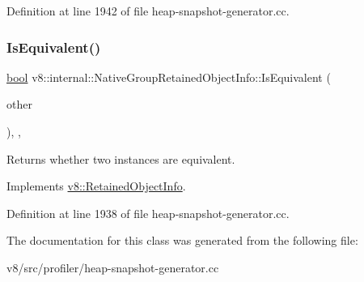Definition at line 1942 of file heap-\/snapshot-\/generator.\+cc.

\mbox{\label{classv8_1_1internal_1_1NativeGroupRetainedObjectInfo_a8d54367b99192c9081d03ccdc8e97612}} 
\subsubsection{\texorpdfstring{Is\+Equivalent()}{IsEquivalent()}}
{\footnotesize\ttfamily \mbox{\hyperlink{classbool}{bool}} v8\+::internal\+::\+Native\+Group\+Retained\+Object\+Info\+::\+Is\+Equivalent (\begin{DoxyParamCaption}\item[{\mbox{\hyperlink{classv8_1_1RetainedObjectInfo}{Retained\+Object\+Info}} $\ast$}]{other }\end{DoxyParamCaption})\hspace{0.3cm}{\ttfamily [inline]}, {\ttfamily [override]}, {\ttfamily [virtual]}}

Returns whether two instances are equivalent. 

Implements \mbox{\hyperlink{classv8_1_1RetainedObjectInfo_a286103bb076c85415919c86b1838c990}{v8\+::\+Retained\+Object\+Info}}.



Definition at line 1938 of file heap-\/snapshot-\/generator.\+cc.



The documentation for this class was generated from the following file\+:\begin{DoxyCompactItemize}
\item 
v8/src/profiler/heap-\/snapshot-\/generator.\+cc\end{DoxyCompactItemize}
